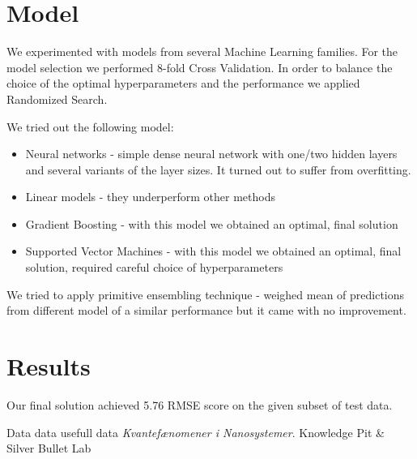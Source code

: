 \documentclass[a4paper]{article}
\begin{document}
\section{Model}
We experimented with models from several Machine Learning families.
For the model selection we performed 8-fold Cross Validation. 
In order to balance the choice of the optimal hyperparameters and the performance we applied Randomized Search.

We tried out the following model:
\begin{itemize}
\item Neural networks - simple dense neural network with one/two hidden layers and several variants of the layer sizes. It turned out to suffer from overfitting.
\item Linear models - they underperform other methods
\item Gradient Boosting - with this model we obtained an optimal, final solution %
\item Supported Vector Machines - with this model we obtained an optimal, final solution, required careful choice of hyperparameters
\end{itemize}



We tried to apply primitive ensembling technique - weighed mean of predictions from different model of a similar performance but it came with no improvement.

\section{Results}
Our final solution achieved 5.76 RMSE score on the given subset of test data.

\begin{thebibliography}{9}
  Data data usefull data
  \emph{Kvantefænomener i Nanosystemer}.
  Knowledge Pit \& Silver Bullet Lab

\end{thebibliography}
\end{document}
